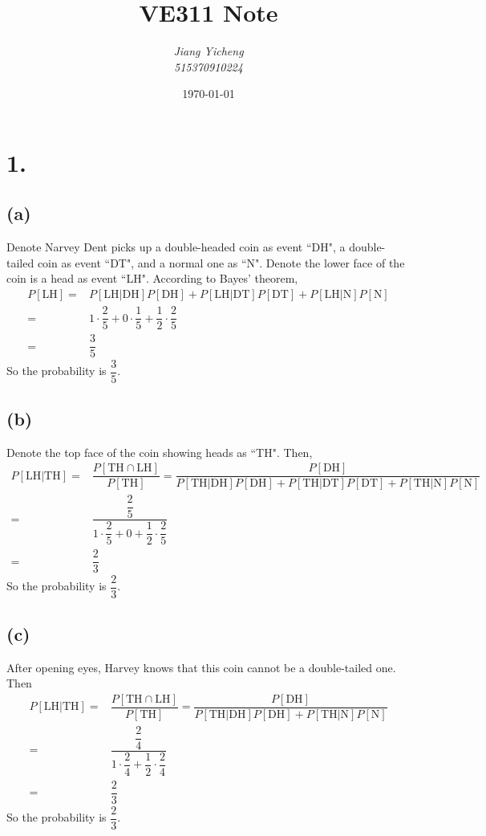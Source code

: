 \documentclass[a4paper,12pt,titlepage]{article}
\author{\textit{Jiang Yicheng}\\\textit{515370910224}}
\title{\textbf{VE311 
		Note}}
\date{\today}
\begin{document}
\section*{1.}
\subsection*{(a)}
Denote Narvey Dent picks up a double-headed coin as event ``DH", a double-tailed coin as event ``DT", and a normal one as ``N". Denote the lower face of the coin is a head as event ``LH". According to Bayes' theorem, 
\begin{align*}
    P[\text{LH}]=&P[\text{LH}|\text{DH}]P[\text{DH}]+P[\text{LH}|\text{DT}]P[\text{DT}]+P[\text{LH}|\text{N}]P[\text{N}]\\
    =&1\cdot\dfrac{2}{5}+0\cdot\dfrac{1}{5}+\dfrac{1}{2}\cdot\dfrac{2}{5}\\
    =&\dfrac{3}{5}
\end{align*}
So the probability is $\dfrac{3}{5}$.

\subsection*{(b)}
Denote the top face of the coin showing  heads as ``TH". Then,
\begin{align*}
    P[\text{LH}|\text{TH}]=&\dfrac{P[\text{TH}\cap\text{LH}]}{P[\text{TH}]}=\dfrac{P[\text{DH}]}{P[\text{TH}|\text{DH}]P[\text{DH}]+P[\text{TH}|\text{DT}]P[\text{DT}]+P[\text{TH}|\text{N}]P[\text{N}]}\\
    =&\dfrac{\dfrac{2}{5}}{1\cdot\dfrac{2}{5}+0+\dfrac{1}{2}\cdot\dfrac{2}{5}}\\
    =&\dfrac{2}{3}
\end{align*}
So the probability is $\dfrac{2}{3}$.

\subsection*{(c)}
After opening eyes, Harvey knows that this coin cannot be a double-tailed one. Then
\begin{align*}
    P[\text{LH}|\text{TH}]=&\dfrac{P[\text{TH}\cap\text{LH}]}{P[\text{TH}]}=\dfrac{P[\text{DH}]}{P[\text{TH}|\text{DH}]P[\text{DH}]+P[\text{TH}|\text{N}]P[\text{N}]}\\
    =&\dfrac{\dfrac{2}{4}}{1\cdot\dfrac{2}{4}+\dfrac{1}{2}\cdot\dfrac{2}{4}}\\
    =&\dfrac{2}{3}
\end{align*}
So the probability is $\dfrac{2}{3}$.
\end{document}
